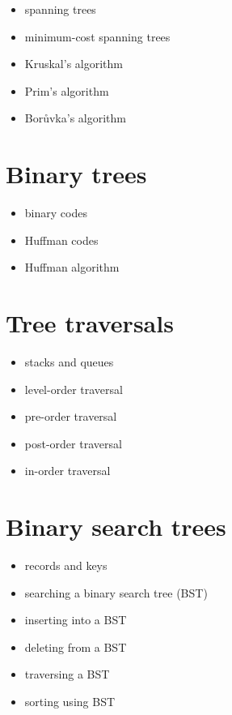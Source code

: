 \begin{itemize}
\item spanning trees

\item minimum-cost spanning trees

\item Kruskal's algorithm

\item Prim's algorithm

\item Bor\r{u}vka's algorithm
\end{itemize}



\section{Binary trees}

\begin{itemize}
\item binary codes

\item Huffman codes

\item Huffman algorithm
\end{itemize}



\section{Tree traversals}

\begin{itemize}
\item stacks and queues

\item level-order traversal

\item pre-order traversal

\item post-order traversal

\item in-order traversal
\end{itemize}



\section{Binary search trees}

\begin{itemize}
\item records and keys

\item searching a binary search tree (BST)

\item inserting into a BST

\item deleting from a BST

\item traversing a BST

\item sorting using BST
\end{itemize}
